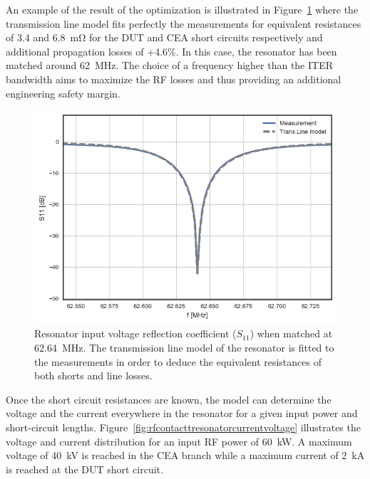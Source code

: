 {An example of the result of the optimization is illustrated in Figure~\ref{fig:rfcontacttresonators11} where the transmission line model fits perfectly the measurements for equivalent resistances of 3.4 and 6.8~mΩ for the DUT and CEA short circuits respectively and additional propagation losses of +4.6\%. In this case, the resonator has been matched around 62~MHz. The choice of a frequency higher than the ITER bandwidth aims to maximize the RF losses and thus providing an additional engineering safety margin. 

\begin{figure}[h]
	\centering
	\includegraphics[width=1.0\linewidth]{figures/chap3/RF_contacts/RF_contact_Tresonator_S11}
	\caption{Resonator input voltage reflection coefficient ($S_{11}$) when matched at 62.64~MHz. The transmission line model of the resonator is fitted to the measurements in order to deduce the equivalent resistances of both shorts and line losses. }
	\label{fig:rfcontacttresonators11}
\end{figure}


Once the short circuit resistances are known, the model can determine the voltage and the current everywhere in the resonator for a given input power and short-circuit lengths. Figure~\ref{fig:rfcontacttresonatorcurrentvoltage} illustrates the voltage and current distribution for an input RF power of 60~kW. A maximum voltage of 40~kV is reached in the CEA branch while a maximum current of 2~kA is reached at the DUT short circuit. 

}

